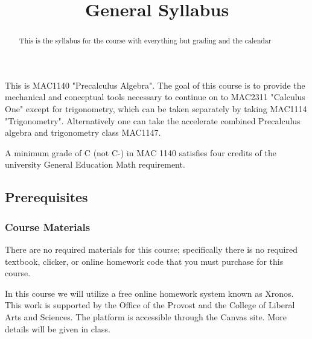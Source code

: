 \documentclass{ximera}
\title{General Syllabus}
\begin{document}
\begin{abstract}
This is the syllabus for the course with everything but grading and the calendar
\end{abstract}
\maketitle

This is MAC1140 "Precalculus Algebra". The goal of this course is to provide the mechanical and conceptual tools necessary to continue on to MAC2311 "Calculus One" except for trigonometry, which can be taken separately by taking MAC1114 "Trigonometry". Alternatively one can take the accelerate combined Precalculus algebra and trigonometry class MAC1147.

A minimum grade of C (not C-) in MAC 1140 satisfies four credits of the university General Education Math requirement.%

\subsection*{Prerequisites}
\begin{center}
\end{center}


\subsubsection*{Course Materials}
    There  are  no  required  materials for this course; specifically there is no required textbook, clicker, or online homework code that you must purchase for  this  course. %
    
    In this course we will utilize a free online homework system known as Xronos. This work is supported by the Office of the Provost and the College of Liberal Arts and Sciences.  The platform is accessible through the Canvas site.  More details will be given in class.
\end{document}
